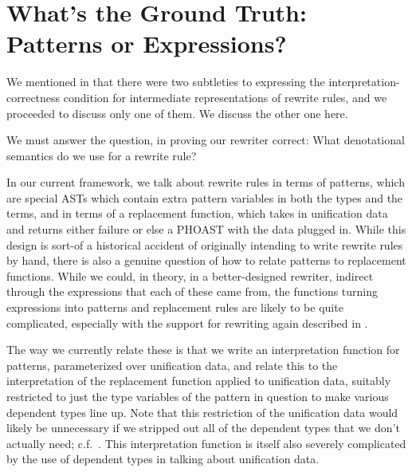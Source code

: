 
\section{What's the Ground Truth: Patterns or Expressions?}\label{sec:rewriting-more:patterns-vs-expressions}
We mentioned in  that there were two subtleties to expressing the interpretation-correctness condition for intermediate representations of rewrite rules, and we proceeded to discuss only one of them.
We discuss the other one here.

We must answer the question, in proving our rewriter correct:
What denotational semantics do we use for a rewrite rule?

In our current framework, we talk about rewrite rules in terms of patterns, which are special ASTs which contain extra pattern variables in both the types and the terms, and in terms of a replacement function, which takes in unification data and returns either failure or else a PHOAST with the data plugged in.
While this design is sort-of a historical accident of originally intending to write rewrite rules by hand, there is also a genuine question of how to relate patterns to replacement functions.
While we could, in theory, in a better-designed rewriter, indirect through the expressions that each of these came from, the functions turning expressions into patterns and replacement rules are likely to be quite complicated, especially with the support for rewriting again described in .

The way we currently relate these is that we write an interpretation function for patterns, parameterized over unification data, and relate this to the interpretation of the replacement function applied to unification data, suitably restricted to just the type variables of the pattern in question to make various dependent types line up.
Note that this restriction of the unification data would likely be unnecessary if we stripped out all of the dependent types that we don't actually need; c.f.~.
This interpretation function is itself also severely complicated by the use of dependent types in talking about unification data.

